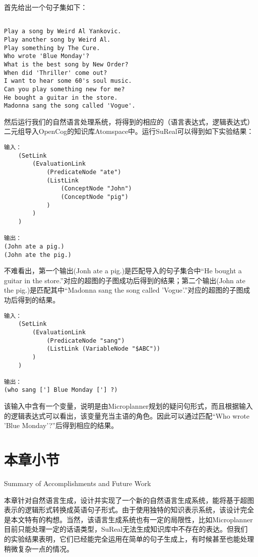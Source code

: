 首先给出一个句子集如下：

\begin{verbatim}

Play a song by Weird Al Yankovic.
Play another song by Weird Al.
Play something by The Cure.
Who wrote 'Blue Monday'?
What is the best song by New Order?
When did 'Thriller' come out?
I want to hear some 60's soul music.
Can you play something new for me?
He bought a guitar in the store.
Madonna sang the song called 'Vogue'.

\end{verbatim}

然后运行我们的自然语言处理系统，将得到的相应的（语言表达式，逻辑表达式）二元组导入OpenCog的知识库Atomspace中。运行SuReal可以得到如下实验结果：

\begin{verbatim}
输入：
    (SetLink
        (EvaluationLink
            (PredicateNode "ate")
            (ListLink
                (ConceptNode "John")
                (ConceptNode "pig")
            )
        )
    )

输出：
(John ate a pig.)
(John ate the pig.)

\end{verbatim}

不难看出，第一个输出(Jonh ate a pig.)是匹配导入的句子集合中“He bought a guitar in the store.”对应的超图的子图成功后得到的结果；第二个输出(John ate the pig.)是匹配其中“Madonna sang the song called 'Vogue'.”对应的超图的子图成功后得到的结果。

\begin{verbatim}
输入：
    (SetLink
        (EvaluationLink
            (PredicateNode "sang")
            (ListLink (VariableNode "$ABC"))
        )
    )

输出：
(who sang ['] Blue Monday ['] ?)

\end{verbatim}

该输入中含有一个变量，说明是由Microplanner规划的疑问句形式，而且根据输入的逻辑表达式可以看出，该变量充当主语的角色。因此可以通过匹配“Who wrote 'Blue Monday'?”后得到相应的结果。

\section{本章小节}{Summary of Accomplishments and Future Work}

本章针对自然语言生成，设计并实现了一个新的自然语言生成系统，能将基于超图表示的逻辑形式转换成英语句子形式。由于使用独特的知识表示系统，该设计完全是本文特有的构想。当然，该语言生成系统也有一定的局限性，比如Microplanner目前只能处理一定的话语类型，SuReal无法生成知识库中不存在的表达。但我们的实验结果表明，它们已经能完全运用在简单的句子生成上，有时候甚至也能处理稍微复杂一点的情况。